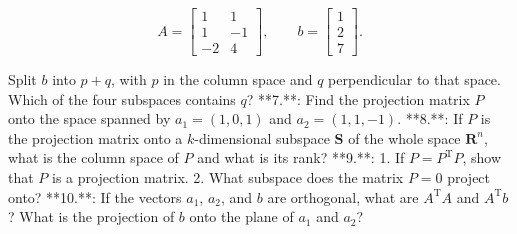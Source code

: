 \[A=\begin{bmatrix}1&1\\ 1&-1\\ -2&4\end{bmatrix},\qquad b=\begin{bmatrix}1\\ 2\\ 7\end{bmatrix}.\]

Split \(b\) into \(p+q\), with \(p\) in the column space and \(q\) perpendicular to that space. Which of the four subspaces contains \(q\)?
**7.**: Find the projection matrix \(P\) onto the space spanned by \(a_{1}=(1,0,1)\) and \(a_{2}=(1,1,-1)\).
**8.**: If \(P\) is the projection matrix onto a \(k\)-dimensional subspace \(\mathbf{S}\) of the whole space \(\mathbf{R}^{n}\), what is the column space of \(P\) and what is its rank?
**9.**: 1. If \(P=P^{\mathrm{T}}P\), show that \(P\) is a projection matrix. 2. What subspace does the matrix \(P=0\) project onto?
**10.**: If the vectors \(a_{1}\), \(a_{2}\), and \(b\) are orthogonal, what are \(A^{\mathrm{T}}A\) and \(A^{\mathrm{T}}b\)? What is the projection of \(b\) onto the plane of \(a_{1}\) and \(a_{2}\)?